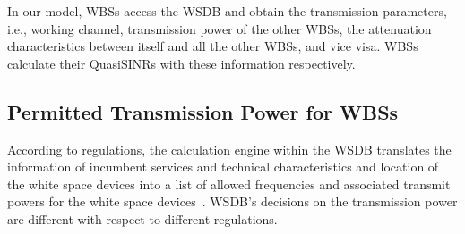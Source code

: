 \documentclass[times]{ettauth}
\newcommand{\ie}{i.e., }
\theoremstyle{mytheoremstyle}
\theoremstyle{mytheoremstyle}
\theoremstyle{mytheoremstyle}
\begin{document}
In our model, WBSs access the WSDB and obtain the transmission parameters, \ie working channel, transmission power of the other WBSs, the attenuation characteristics between itself and all the other WBSs, and vice visa. 
WBSs calculate their QuasiSINRs with these information respectively.


\subsection{Permitted Transmission Power for WBSs}
According to regulations, the calculation engine within the WSDB translates the information of incumbent services and technical characteristics and location of the white space devices into a list of allowed frequencies and associated transmit powers for the white space devices~\cite{ECC236}.
WSDB's decisions on the transmission power are different with respect to different regulations.
\end{document}
